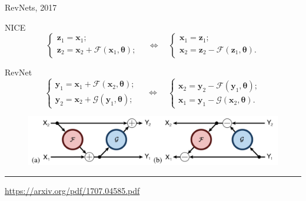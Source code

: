 \documentclass{beamer}
\newcommand{\bx}{\mathbf{x}}
\newcommand{\bz}{\mathbf{z}}
\newcommand{\by}{\mathbf{y}}
\newcommand{\btheta}{\boldsymbol{\theta}}
\begin{document}
\begin{frame}{RevNets, 2017}
	\begin{block}{NICE}
		\vspace{-0.2cm}
		\begin{equation*}
			\begin{cases} \bz_1 = \bx_1; \\ \bz_2 = \bx_2 + \mathcal{F}(\bx_1, \btheta);\end{cases}  \quad \Leftrightarrow \quad 
			\begin{cases} \bx_1 = \bz_1; \\ \bx_2 = \bz_2 - \mathcal{F}(\bz_1, \btheta).\end{cases} 
		\end{equation*}
		\vspace{-0.2cm}
	\end{block}
	\begin{block}{RevNet}
		\begin{equation*}
			\begin{cases} \by_1 = \bx_1 + \mathcal{F}(\bx_2, \btheta); \\ \by_2 = \bx_2 + \mathcal{G}(\by_1, \btheta);\end{cases} \quad \Leftrightarrow \quad 
			\begin{cases} \bx_2 = \by_2 - \mathcal{F}(\by_1, \btheta); \\ \bx_1 = \by_1 - \mathcal{G}(\bx_2, \btheta).\end{cases} 
		\end{equation*}
	\end{block}
	\begin{figure}
		\centering
		\includegraphics[width=\linewidth]{figs/revnet.png}
	\end{figure}
	\vfill
	\hrule\medskip
	{\scriptsize \href{https://arxiv.org/pdf/1707.04585.pdf}{https://arxiv.org/pdf/1707.04585.pdf}} 
\end{frame}
\end{document}

